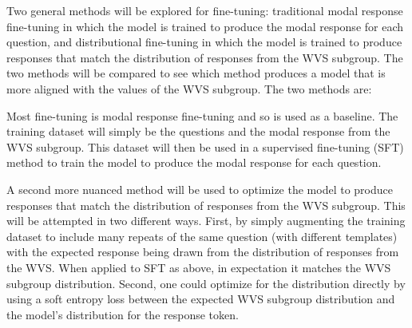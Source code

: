 \documentclass[11pt, a4paper]{article}
\begin{document}
Two general methods will be explored for fine-tuning: traditional modal response fine-tuning in which the model is trained to produce the modal response for each question, and distributional fine-tuning in which the model is trained to produce responses that match the distribution of responses from the WVS subgroup. The two methods will be compared to see which method produces a model that is more aligned with the values of the WVS subgroup. The two methods are:

Most fine-tuning is modal response fine-tuning and so is used as a baseline. The training dataset will simply be the questions and the modal response from the WVS subgroup. This dataset will then be used in a supervised fine-tuning (SFT) method \cite{ouyangTrainingLanguageModels2022} to train the model to produce the modal response for each question.

A second more nuanced method will be used to optimize the model to produce responses that match the distribution of responses from the WVS subgroup. This will be attempted in two different ways. First, by simply augmenting the training dataset to include many repeats of the same question (with different templates) with the expected response being drawn from the distribution of responses from the WVS. When applied to SFT as above, in expectation it matches the WVS subgroup distribution. Second, one could optimize for the distribution directly by using a soft entropy loss between the expected WVS subgroup distribution and the model's distribution for the response token.

\end{document}

